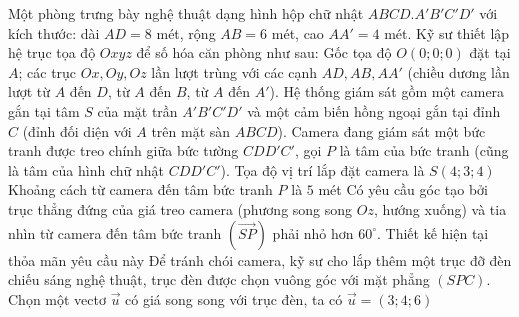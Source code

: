 \begin{ex}%
	Một phòng trưng bày nghệ thuật dạng hình hộp chữ nhật $ABCD. A'B'C'D'$ với kích thước: dài $AD=8$ mét, rộng $AB=6$ mét, cao $AA'=4$ mét. Kỹ sư thiết lập hệ trục tọa độ $Oxyz$ để số hóa căn phòng như sau: Gốc tọa độ $O(0;0;0)$ đặt tại $A$; các trục $Ox, Oy, Oz$ lần lượt trùng với các cạnh $AD, AB, AA'$ (chiều dương lần lượt từ $A$ đến $D$, từ $A$ đến $B$, từ $A$ đến $A'$). Hệ thống giám sát gồm một camera gắn tại tâm $S$ của mặt trần $A'B'C'D'$ và một cảm biến hồng ngoại gắn tại đỉnh $C$ (đỉnh đối diện với $A$ trên mặt sàn $ABCD$). Camera đang giám sát một bức tranh được treo chính giữa bức tường $CDD'C'$, gọi $P$ là tâm của bức tranh (cũng là tâm của hình chữ nhật $CDD'C'$).
	\choiceTF
	{\True Tọa độ vị trí lắp đặt camera là $S(4;3;4)$}
	{Khoảng cách từ camera đến tâm bức tranh $P$ là $5$ mét}
	{Có yêu cầu góc tạo bởi trục thẳng đứng của giá treo camera (phương song song $Oz$, hướng xuống) và tia nhìn từ camera đến tâm bức tranh $\left(\overrightarrow{SP}\right)$ phải nhỏ hơn $60^\circ$. Thiết kế hiện tại thỏa mãn yêu cầu này}
	{\True Để tránh chói camera, kỹ sư cho lắp thêm một trục đỡ đèn chiếu sáng nghệ thuật, trục đèn được chọn vuông góc với mặt phẳng $(SPC)$. Chọn một vectơ $\overrightarrow{u}$ có giá song song với trục đèn, ta có $\overrightarrow{u}=(3;4;6)$}
\end{ex}
